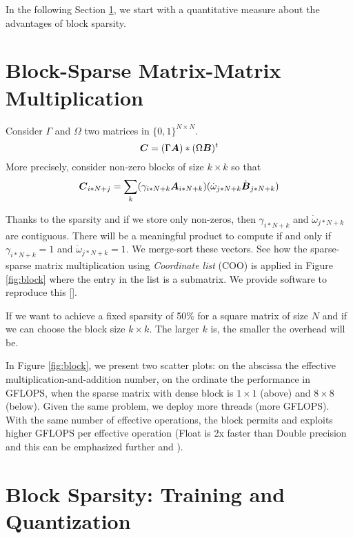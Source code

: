 \documentclass{IEEEtran}
\begin{document}
In the following Section \ref{sec:motivation}, we start with a
quantitative measure about the advantages of block sparsity.

\section{Block-Sparse Matrix-Matrix Multiplication}
\label{sec:motivation}

Consider $\Gamma$ and $\Omega$ two matrices
in $\{0,1\}^{N\times N}$.
\begin{equation}
  {\boldsymbol C} = (\Gamma {\boldsymbol A}) * (\Omega {\boldsymbol B})^t
\end{equation}
More precisely, consider non-zero blocks of size $k\times k$ so that
\begin{equation}
  {\boldsymbol C}_{i*N+j} = \sum_k ( \gamma_{i*N+k} {\boldsymbol A}_{i*N+k} ) (\dot{\omega}_{j*N+k} \dot{{\boldsymbol B}}_{j*N+k})
\end{equation}


Thanks to the sparsity and if we store only non-zeros, then
$\gamma_{i*N+k}$ and $\dot{\omega}_{j*N+k}$ are contiguous. There will
be a meaningful product to compute if and only if $\gamma_{i*N+k} =1$
and $\dot{\omega}_{j*N+k} =1$.  We merge-sort these vectors.  See how
the sparse-sparse matrix multiplication using {\em Coordinate list}
(COO) is applied in Figure \ref{fig:block} where the entry in the list
is a submatrix.  We provide software to reproduce this []. %

If we want to achieve a fixed sparsity of 50\% for a square matrix of
size $N$ and if we can choose the block size $k \times k$. The larger
$k$ is, the smaller the overhead will be.


In Figure \ref{fig:block}, we present two scatter plots: on the
abscissa the effective multiplication-and-addition number, on the
ordinate the performance in GFLOPS, when the sparse matrix with dense
block is $1\times 1$ (above) and $8\times8$ (below). Given the same
problem, we deploy more threads (more GFLOPS).  With the same number
of effective operations, the block permits and exploits higher GFLOPS
per effective operation (Float is 2x faster than Double precision and
this can be emphasized further \cite{Gray2017GPUKF,li2023popsparse}
and \cite{pmlr-v119-kurtz20a}).


\section{Block Sparsity: Training and Quantization}
\label{sec:training}
\end{document}
